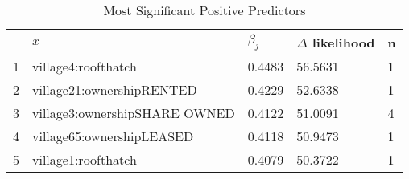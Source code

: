 \begin{table}[ht]
\centering
\begin{tabular}{rllll}
  \hline
 & $x$ & $\beta_j$ & $\Delta$ likelihood & n \\ 
  \hline
1 & village4:roofthatch & 0.4483 & 56.5631 & 1 \\ 
  2 & village21:ownershipRENTED & 0.4229 & 52.6338 & 1 \\ 
  3 & village3:ownershipSHARE OWNED & 0.4122 & 51.0091 & 4 \\ 
  4 & village65:ownershipLEASED & 0.4118 & 50.9473 & 1 \\ 
  5 & village1:roofthatch & 0.4079 & 50.3722 & 1 \\ 
   \hline
\end{tabular}
\caption{Most Significant Positive Predictors} 
\label{tab:pos}
\end{table}
